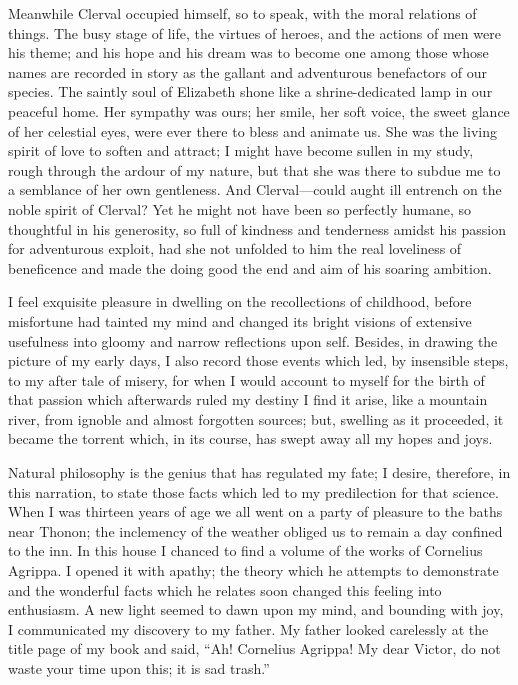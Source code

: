 \documentclass[12pt,openright]{book}
\begin{document}
Meanwhile Clerval occupied himself, so to speak, with the moral relations of things. The busy stage of life, the virtues of heroes, and the actions of men were his theme; and his hope and his dream was to become one among those whose names are recorded in story as the gallant and adventurous benefactors of our species. The saintly soul of Elizabeth shone like a shrine-dedicated lamp in our peaceful home. Her sympathy was ours; her smile, her soft voice, the sweet glance of her celestial eyes, were ever there to bless and animate us. She was the living spirit of love to soften and attract; I might have become sullen in my study, rough through the ardour of my nature, but that she was there to subdue me to a semblance of her own gentleness. And Clerval—could aught ill entrench on the noble spirit of Clerval? Yet he might not have been so perfectly humane, so thoughtful in his generosity, so full of kindness and tenderness amidst his passion for adventurous exploit, had she not unfolded to him the real loveliness of beneficence and made the doing good the end and aim of his soaring ambition.

I feel exquisite pleasure in dwelling on the recollections of childhood, before misfortune had tainted my mind and changed its bright visions of extensive usefulness into gloomy and narrow reflections upon self. Besides, in drawing the picture of my early days, I also record those events which led, by insensible steps, to my after tale of misery, for when I would account to myself for the birth of that passion which afterwards ruled my destiny I find it arise, like a mountain river, from ignoble and almost forgotten sources; but, swelling as it proceeded, it became the torrent which, in its course, has swept away all my hopes and joys.

Natural philosophy is the genius that has regulated my fate; I desire, therefore, in this narration, to state those facts which led to my predilection for that science. When I was thirteen years of age we all went on a party of pleasure to the baths near Thonon; the inclemency of the weather obliged us to remain a day confined to the inn. In this house I chanced to find a volume of the works of Cornelius Agrippa. I opened it with apathy; the theory which he attempts to demonstrate and the wonderful facts which he relates soon changed this feeling into enthusiasm. A new light seemed to dawn upon my mind, and bounding with joy, I communicated my discovery to my father. My father looked carelessly at the title page of my book and said, “Ah! Cornelius Agrippa! My dear Victor, do not waste your time upon this; it is sad trash.”
\end{document}
